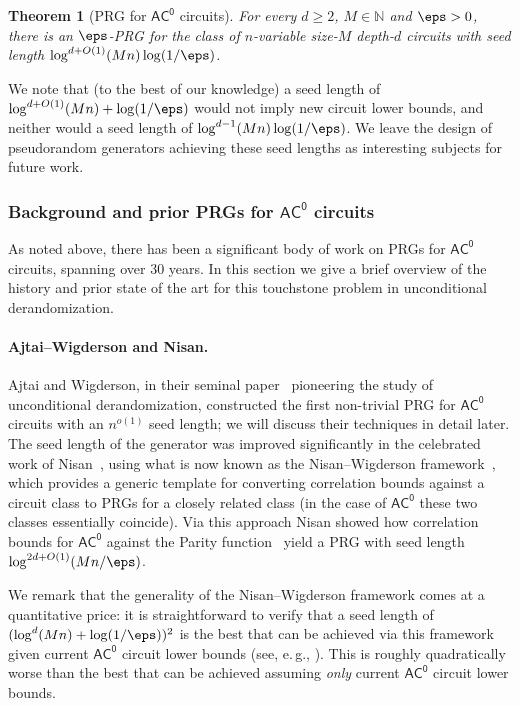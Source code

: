 \documentclass[11pt]{article}
\numberwithin{equation}{section}
\newtheorem{theorem}{Theorem}[section]
\theoremstyle{definition}
\theoremstyle{plain}
\newcommand{\N}{\mathbb N}
\newcommand{\eg}{e.\,g.}
\theoremstyle{plain}
\newcommand{\acz}{\mathsf{AC^0}}
\renewcommand{\N}{\mathds{N}}
\begin{document}
%
%
%
%
%
%
%
%
%
%
%

\begin{theorem}[PRG for $\acz$ circuits] \label{thm:first}
For every $d\ge 2$, $M\in \N$ and $\eps > 0$, there is an $\eps$-PRG for the class of $n$-variable size-$M$ depth-$d$ circuits with seed length $\log^{d+O(1)}(Mn)\log(1/\eps)$. 
\end{theorem}

We note that (to the best of our knowledge) a seed length of $\log^{d+O(1)}(Mn) + \log(1/\eps)$ would not imply new circuit lower bounds, and neither would a seed length of $\log^{d-1}(Mn)\log(1/\eps)$.  We leave the design of pseudorandom generators achieving these seed lengths as interesting subjects for future work.

\subsubsection{Background and prior PRGs for $\acz$ circuits}  \label{sec:background-acz}

As noted above,  %
there has been a significant body of work on PRGs for $\acz$ circuits, spanning over 30 years. In this section we give a brief overview of the history and prior %
state of the art  %
for this touchstone problem in unconditional derandomization. 

\vspace{-5pt} 

\paragraph{Ajtai--Wigderson and Nisan.}
Ajtai and Wigderson, in their seminal %
paper~\cite{AjtaiWigderson:85}   %
pioneering the study of unconditional derandomization, constructed the first non-trivial PRG for $\acz$ circuits with an $n^{o(1)}$ seed length; we will discuss their techniques in detail later. The seed length of the \cite{AjtaiWigderson:85} generator was improved significantly in the celebrated work of Nisan~\cite{Nis91}, using what is now known as the Nisan--Wigderson framework~\cite{NW94}, which provides a generic template for converting correlation bounds against a circuit class to PRGs for a closely related class (in the case of $\acz$ these two classes essentially coincide).  Via this approach Nisan showed how correlation bounds for $\acz$ against the {\sc Parity} function~\cite{Hastad86} yield a PRG with seed length  $\log^{2d+O(1)}(Mn/\eps)$. 

We remark that the generality of the Nisan--Wigderson framework comes at a quantitative price: it is straightforward to verify that a seed length of $(\log^{d}(Mn) + \log(1/\eps))^2$ is the best that can be achieved via this framework given current $\acz$ circuit lower bounds (see, \eg, \cite{TX13,HS16journal}). This is roughly quadratically worse than
%
the best that can be achieved assuming \emph{only} current $\acz$ circuit lower bounds.
\end{document}
